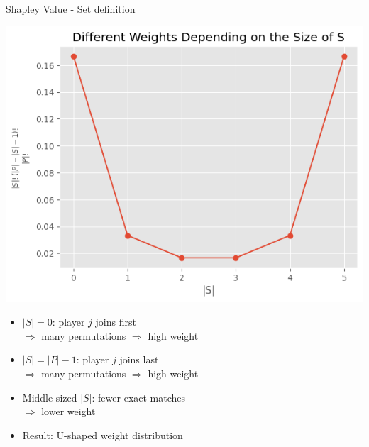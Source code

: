 \documentclass[10pt,compress,t,notes=noshow, xcolor=table]{beamer}
\begin{document}
\begin{frame}{Shapley Value - Set definition}
\pause
    \begin{minipage}[c]{0.44\textwidth}
        \includegraphics[width=\textwidth]{figure_man/multinom_coef_over_size.png}
    \end{minipage}
    \begin{minipage}[c]{0.55\textwidth}
\begin{itemize}
  \item \( |S| = 0 \): player \( j \) joins first\\ \( \Rightarrow \) many permutations \( \Rightarrow \) high weight
  \item \( |S| = |P| - 1 \): player \( j \) joins last\\
  \( \Rightarrow \) many permutations \( \Rightarrow \) high weight
  \item Middle-sized \( |S| \): fewer exact matches \\
  \( \Rightarrow \) lower weight
  \item Result: U-shaped weight distribution %
\end{itemize}
    \end{minipage}
\end{frame}
\end{document}
